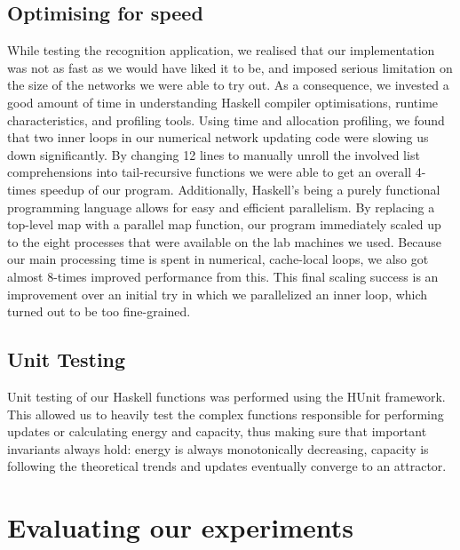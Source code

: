 \subsection{Optimising for speed}

While testing the recognition application, we realised that our implementation was not as fast as we would have liked it to be, and imposed serious limitation on the size of the networks we were able to try out.
As a consequence, we invested a good amount of time in understanding Haskell compiler optimisations, runtime characteristics, and profiling tools. Using time and allocation profiling, we found that two inner loops in our numerical network updating code were slowing us down significantly. By changing 12 lines to manually unroll the involved list comprehensions into tail-recursive functions we were able to get an overall 4-times speedup of our program.
Additionally, Haskell's being a purely functional programming language allows for easy and efficient parallelism.
By replacing a top-level map with a parallel map function, our program immediately scaled up to the eight processes that were available on the lab machines we used. Because our main processing time is spent in numerical, cache-local loops, we also got almost 8-times improved performance from this. This final scaling success is an improvement over an initial try in which we parallelized an inner loop, which turned out to be too fine-grained.


\subsection{Unit Testing}

Unit testing of our Haskell functions was performed using the HUnit framework. This allowed us to heavily test the complex functions responsible for performing updates or calculating energy and capacity, thus making sure that important invariants always hold: energy is always monotonically decreasing, capacity is following the theoretical trends and updates eventually converge to an attractor.


\section{Evaluating our experiments}

